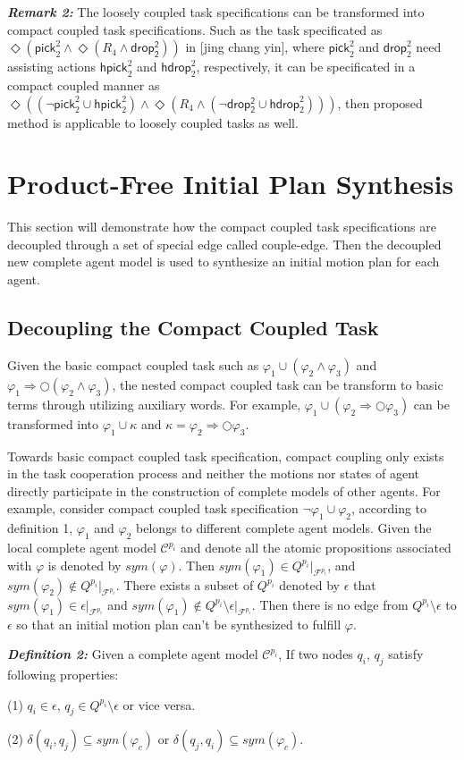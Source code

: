 \documentclass[journal]{IEEEtran}
\begin{document}
\textbf{\emph{Remark 2:}} The loosely coupled task specifications can be transformed into compact coupled task specifications. Such as the task specificated as $\Diamond(\mathsf{pick}^2_2 \wedge \Diamond (R_4 \wedge \mathsf{drop^2_2}))$ in [jing chang yin], where $\mathsf{pick}^2_2$ and $\mathsf{drop}^2_2$ need assisting actions $\mathsf{hpick}^2_2$ and $\mathsf{hdrop}^2_2$, respectively, it can be specificated in a compact coupled manner as $\Diamond((\neg \mathsf{pick}^2_2 \cup \mathsf{hpick}^2_2 )\wedge \Diamond (R_4 \wedge (\neg \mathsf{drop^2_2} \cup \mathsf{hdrop}^2_2)))$, then proposed method is applicable to loosely coupled tasks as well.
\section{Product-Free Initial Plan Synthesis}
This section will demonstrate how the compact coupled task specifications are decoupled through a set of special edge called couple-edge. Then the decoupled new complete agent model is used to synthesize an initial motion plan for each agent.
\subsection{Decoupling the Compact Coupled Task}
Given the basic compact coupled task such as $\varphi_1 \cup (\varphi_2 \wedge \varphi_3)$ and $\varphi_1 \Longrightarrow \bigcirc(\varphi_2 \wedge \varphi_3)$, the nested compact coupled task can be transform to basic terms through utilizing auxiliary words. For example, $\varphi_1 \cup (\varphi_2 \Longrightarrow \bigcirc \varphi_3)$ can be transformed into $\varphi_1 \cup \kappa$ and $\kappa=\varphi_2 \Longrightarrow \bigcirc \varphi_3$.
\par
Towards basic compact coupled task specification, compact coupling only exists in the task cooperation process and neither the motions nor states of agent directly participate in the construction of complete models of other agents. For example, consider compact coupled task specification $\neg \varphi_1\cup\varphi_2$, according to definition 1, $\varphi_1$ and $\varphi_2$ belongs to different complete agent models. Given the local complete agent model $\mathcal{C}^{p_i}$ and denote all the atomic propositions associated with $\varphi$ is denoted by $sym(\varphi)$. Then $sym(\varphi_1) \in Q^{p_i}|_{\mathcal{F}^{p_i}}$, and $sym(\varphi_2) \notin Q^{p_i}|_{\mathcal{F}^{p_i}} $. There exists a subset of $Q^{p_i}$ denoted by $\epsilon$ that $sym(\varphi_1) \in \epsilon |_{\mathcal{F}^{p_i}}$ and $sym(\varphi_1) \notin Q^{p_i} \setminus \epsilon |_{\mathcal{F}^{p_i}}$. Then there is no edge from $Q^{p_i} \setminus \epsilon$ to $\epsilon$ so that an initial motion plan can't be synthesized to fulfill $\varphi$.\par
\textbf{\emph{Definition 2:}} Given a complete agent model $\mathcal{C}^{p_i}$, If two nodes $q_i$, $q_j$ satisfy following properties:
\par
(1) $q_i \in \epsilon$, $q_j \in Q^{p_i} \setminus \epsilon$ or vice versa.\par
(2) $\delta(q_i,q_j)\subseteq sym(\varphi_c)$ or $\delta(q_j,q_i)\subseteq sym(\varphi_c)$.
\end{document}

